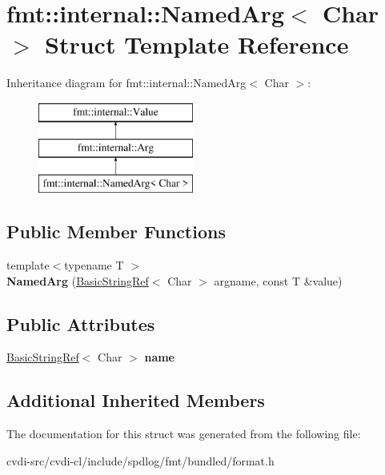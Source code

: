 \hypertarget{structfmt_1_1internal_1_1NamedArg}{}\section{fmt\+:\+:internal\+:\+:Named\+Arg$<$ Char $>$ Struct Template Reference}
\label{structfmt_1_1internal_1_1NamedArg}
Inheritance diagram for fmt\+:\+:internal\+:\+:Named\+Arg$<$ Char $>$\+:\begin{figure}[H]
\begin{center}
\leavevmode
\includegraphics[height=3.000000cm]{structfmt_1_1internal_1_1NamedArg}
\end{center}
\end{figure}
\subsection*{Public Member Functions}
\begin{DoxyCompactItemize}
\item 
{\footnotesize template$<$typename T $>$ }\\{\bfseries Named\+Arg} (\hyperlink{classfmt_1_1BasicStringRef}{Basic\+String\+Ref}$<$ Char $>$ argname, const T \&value)\hypertarget{structfmt_1_1internal_1_1NamedArg_a44557d139403597d7e4c73013f98db73}{}\label{structfmt_1_1internal_1_1NamedArg_a44557d139403597d7e4c73013f98db73}

\end{DoxyCompactItemize}
\subsection*{Public Attributes}
\begin{DoxyCompactItemize}
\item 
\hyperlink{classfmt_1_1BasicStringRef}{Basic\+String\+Ref}$<$ Char $>$ {\bfseries name}\hypertarget{structfmt_1_1internal_1_1NamedArg_ab2e3ffba4fa9df8122ed586134eac2c9}{}\label{structfmt_1_1internal_1_1NamedArg_ab2e3ffba4fa9df8122ed586134eac2c9}

\end{DoxyCompactItemize}
\subsection*{Additional Inherited Members}


The documentation for this struct was generated from the following file\+:\begin{DoxyCompactItemize}
\item 
cvdi-\/src/cvdi-\/cl/include/spdlog/fmt/bundled/format.\+h\end{DoxyCompactItemize}
